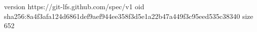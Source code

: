 version https://git-lfs.github.com/spec/v1
oid sha256:8a4f3afa124d6861def9aef944ee358f3d5e1a22b47a449f3c95eed535c38340
size 652
